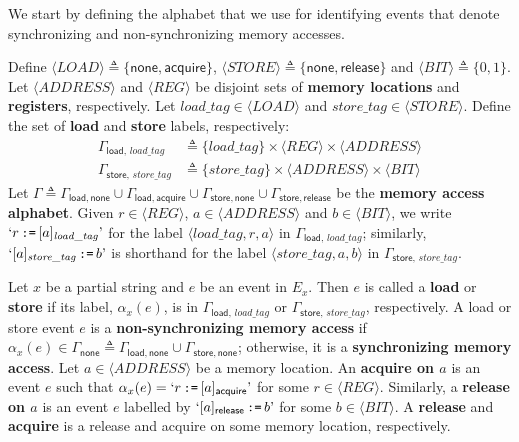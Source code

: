 \documentclass{llncs}
\newcommand{\tuple}[1]{\mbox{$\langle #1 \rangle$}}
\newcommand{\set}[1]{\mbox{$\{ #1 \}$}}
\newcommand{\deq}{\triangleq}
\newcommand{\defn}[1]{\textbf{#1}}
\begin{document}
We start by defining the alphabet that we use for identifying events that denote synchronizing and non-synchronizing memory accesses.

\newcommand{\memorylocation}{\langle\textit{ADDRESS}\rangle}
\newcommand{\register}{\langle\textit{REG}\rangle}
\newcommand{\loadmemoryorder}{\langle\textit{LOAD}\rangle}
\newcommand{\storememoryorder}{\langle\textit{STORE}\rangle}
\newcommand{\bit}{\langle\textit{BIT}\rangle}

\begin{definition}
\label{def:memory-access-alphabet}
Define $\loadmemoryorder \deq \set{\mathsf{none}, \mathsf{acquire}}$, $\storememoryorder \deq \set{\mathsf{none}, \mathsf{release}}$ and $\bit \deq \set{0,1}$. Let $\memorylocation$ and $\register$ be disjoint sets of \defn{memory locations} and \defn{registers}, respectively. Let $\mathit{load\_tag} \in \loadmemoryorder$ and $\mathit{store\_tag} \in \storememoryorder$. Define the set of \defn{load} and \defn{store} labels, respectively:
\label{def:alphabet}
\begin{align*}
\Gamma_{\mathsf{load},\,\mathit{load\_tag}} &\deq \set{\mathit{load\_tag}} \times \register \times \memorylocation \\
\Gamma_{\mathsf{store},\,\mathit{store\_tag}} &\deq \set{\mathit{store\_tag}} \times \memorylocation \times \bit
\end{align*}
Let $\Gamma \deq \Gamma_{\mathsf{load}, \mathsf{none}} \cup \Gamma_{\mathsf{load}, \mathsf{acquire}} \cup \Gamma_{\mathsf{store}, \mathsf{none}} \cup \Gamma_{\mathsf{store}, \mathsf{release}}$ be the \defn{memory access alphabet}. Given $r \in \register$, $a \in \memorylocation$ and $b \in \bit$, we write $`r\, \texttt{:=}\, [a]_\mathit{load\_tag}\textrm'$ for the label $\tuple{\mathit{load\_tag}, r, a}$ in $\Gamma_{\mathsf{load},\,\mathit{load\_tag}}$; similarly, $`[a]_\mathit{store\_tag}\,\texttt{:=}\,b\textrm'$ is shorthand for the label $\tuple{\mathit{store\_tag}, a, b}$ in $\Gamma_{\mathsf{store},\,\mathit{store\_tag}}$.

Let $x$ be a partial string and $e$ be an event in $E_x$. Then $e$ is called a \defn{load} or \defn{store} if its label, $\alpha_x(e)$, is in $\Gamma_{\mathsf{load},\,\mathit{load\_tag}}$ or $\Gamma_{\mathsf{store},\,\mathit{store\_tag}}$, respectively. A load or store event $e$ is a \defn{non-synchronizing memory access} if $\alpha_x(e) \in \Gamma_\mathsf{none} \deq \Gamma_{\mathsf{load}, \mathsf{none}} \cup \Gamma_{\mathsf{store}, \mathsf{none}}$; otherwise, it is a \defn{synchronizing memory access}. Let $a \in \memorylocation$ be a memory location. An \defn{acquire on $a$} is an event $e$ such that $\alpha_x(e) = `r\, \texttt{:=}\, [a]_\mathsf{acquire}\textrm'$ for some $r \in \register$. Similarly, a \defn{release on $a$} is an event $e$ labelled by $`[a]_\mathsf{release}\,\texttt{:=}\,b\textrm'$ for some $b \in \bit$. A \defn{release} and \defn{acquire} is a release and acquire on some memory location, respectively.
\end{definition}
\end{document}
